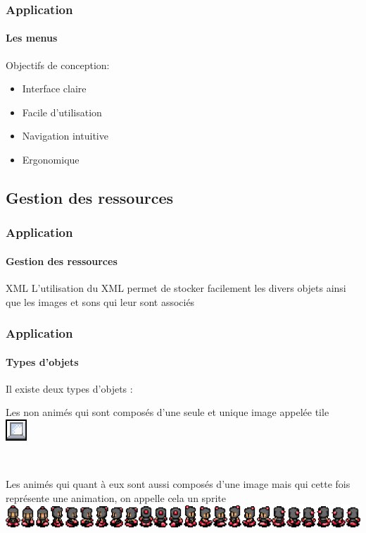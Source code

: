 	\begin{frame}
	\frametitle{Application}
	\framesubtitle{Les menus}
	
		\begin{block}{Objectifs de conception:}
			\begin{itemize}
			  \item Interface claire
			  \item Facile d'utilisation
			  \item Navigation intuitive
			  \item Ergonomique
			\end{itemize}
		\end{block}
	\end{frame}
	
\subsection{Gestion des ressources}

	\begin{frame}
		\frametitle{Application}
		\framesubtitle{Gestion des ressources}
		
		\begin{block}{XML}
			L'utilisation du XML permet de stocker facilement les divers objets ainsi que
			les images et sons qui leur sont associés
		\end{block}
		
	\end{frame}
	
	\begin{frame}
		\frametitle{Application}
		\framesubtitle{Types d'objets}
			Il existe deux types d'objets :
			
			\begin{center}
				Les non animés qui sont composés d'une seule et unique image appelée tile \\
				\includegraphics[scale=0.75]{img/bloc.png}
				
				$\,$
				
				\item Les animés qui quant à eux sont aussi composés d'une image mais qui cette fois représente une animation, on appelle cela un sprite \\
				\includegraphics[scale=0.40]{img/player.png}
			\end{center}		
	\end{frame}
	
